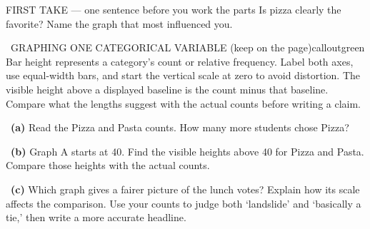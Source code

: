 \documentclass[11pt]{article}
\begin{document}
\begin{firsttakebox}{FIRST TAKE --- one sentence before you work the parts}
Is pizza clearly the favorite? Name the graph that most influenced you.\par
{}
\end{firsttakebox}

\begin{callout}{\IconBook\ GRAPHING ONE CATEGORICAL VARIABLE (keep on the page)}{calloutgreen}
Bar height represents a category's count or relative frequency. Label both axes, use equal-width bars, and start the vertical scale at zero to avoid distortion. The visible height above a displayed baseline is the count minus that baseline. Compare what the lengths suggest with the actual counts before writing a claim.
\end{callout}

~\textbf{(a)} Read the Pizza and Pasta counts. How many more students chose Pizza?\par
{}

~\textbf{(b)} Graph A starts at 40. Find the visible heights above 40 for Pizza and Pasta. Compare those heights with the actual counts.\par
{}

~\textbf{(c)} Which graph gives a fairer picture of the lunch votes? Explain how its scale affects the comparison. Use your counts to judge both `landslide' and `basically a tie,' then write a more accurate headline.\par
{}
\end{document}
